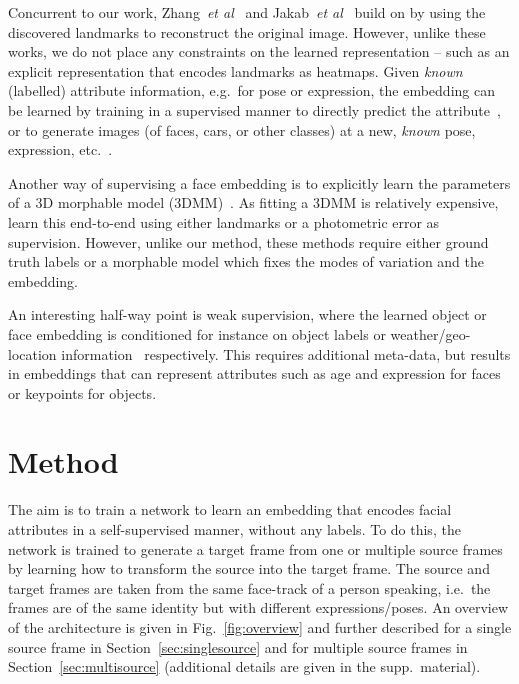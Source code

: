 \documentclass{bmvc2k}
\newcommand{\figref}[1]{Fig.~\ref{#1}}
\newcommand{\secref}[1]{Section~\ref{#1}}
\def\etal{\emph{et al}\bmvaOneDot}
\begin{document}
Concurrent to our work, Zhang~\etal~\cite{zhang2018unsupervised} and Jakab~\etal~\cite{jakab2018conditional} build on \cite{Thewlis17a} by
 using the discovered landmarks to reconstruct the original image.
However, unlike these works,  we do not place any constraints on the learned representation -- such 
as an explicit representation that encodes landmarks as heatmaps. 
Given {\em known} (labelled) attribute information, e.g.\ for pose or expression, 
the embedding can be learned by training in a supervised
manner to directly predict the attribute~\cite{Kumar11,rudd2016moon,liu2015faceattributes}, 
 or to generate images (of faces, cars, or other classes) at a new,
{\em known} pose, expression,
etc.~\cite{Tran17drgan,yang2017neural,dosovitskiy2015learning,kulkarni2015deep,zhou2016view}.

 Another way of supervising a face embedding is to explicitly learn the parameters of a 3D morphable model (3DMM)~\cite{Blanz02}.
 As fitting a 3DMM is relatively expensive, \cite{Bas17,Tewari17} learn this end-to-end using either landmarks or a photometric error as supervision.
 However, unlike our method, these methods require either ground truth labels or a morphable model which fixes the modes of variation and the embedding.

\noindent An interesting half-way point is weak supervision, where the learned object or face embedding is conditioned for instance on object labels \cite{novotny2017anchornet} or weather/geo-location information~\cite{li2015two} respectively.
This requires additional meta-data, but results in embeddings that can represent attributes such as age and expression for faces or keypoints for objects.



\section{Method}\label{sec:method}

The aim is to train a network to learn an embedding that encodes facial attributes in a self-supervised manner, without any labels.
To do this, the network is trained to generate a target frame from one or multiple source frames by learning how to transform the source into the target frame. 
The source and target frames are taken from the same face-track of a person speaking, i.e.~the frames are  of the same identity but with different expressions/poses.
An overview of the architecture is given in \figref{fig:overview} and further described for a single source frame in \secref{sec:singlesource} and for multiple source frames in \secref{sec:multisource} (additional details are given in the supp.~material). 
\end{document}
